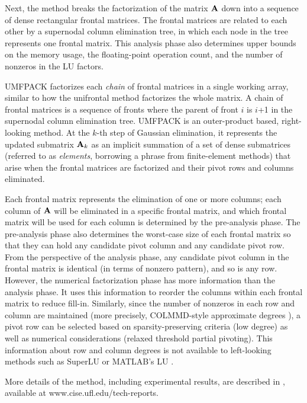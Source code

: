 Next, the method breaks the factorization of the matrix ${\bf{A}}$ down into a
sequence of dense rectangular frontal matrices.  The frontal matrices are
related to each other by a supernodal column elimination tree, in which each
node in the tree represents one frontal matrix.  This analysis phase also
determines upper bounds on the memory usage, the floating-point operation count,
and the number of nonzeros in the LU factors.

UMFPACK factorizes each {\em chain} of frontal matrices in a single working
array, similar to how the unifrontal method \cite{dusc:96} factorizes the whole
matrix.  A chain of frontal matrices is a sequence of fronts where the parent
of front $i$ is $i$+1 in the supernodal column elimination tree.  UMFPACK is an
outer-product based, right-looking method.  At the $k$-th step of Gaussian
elimination, it represents the updated submatrix ${\bf{A}}_k$ as an implicit
summation of a set of dense submatrices (referred to as {\em elements},
borrowing a phrase from finite-element methods) that arise when the frontal
matrices are factorized and their pivot rows and columns eliminated.

Each frontal matrix represents the elimination of one or more columns;
each column of ${\bf{A}}$ will be eliminated in a specific frontal matrix,
and which frontal matrix will be used for each column is determined by
the pre-analysis phase.  The pre-analysis phase also determines the worst-case
size of each frontal matrix so that they can hold any candidate pivot column
and any candidate pivot row.  From the perspective of the analysis phase, any
candidate pivot column in the frontal matrix is identical (in terms of nonzero
pattern), and so is any row.  However, the numerical factorization phase has
more information than the analysis phase.  It uses this information to reorder
the columns within each frontal matrix to reduce fill-in.  Similarly, since
the number of nonzeros in each row and column are maintained (more precisely,
COLMMD-style approximate degrees \cite{GilbertMolerSchreiber}), a pivot row can
be selected based on sparsity-preserving criteria (low degree) as well as
numerical considerations (relaxed threshold partial pivoting).  This information
about row and column degrees is not available to left-looking methods such as
SuperLU \cite{SuperLU99} or MATLAB's LU
\cite{GilbertMolerSchreiber,GilbertPeierls88}.

More details of the method, including experimental results, are
described in \cite{Davis02_algo,Davis02}, available at
www.cise.ufl.edu/tech-reports.

